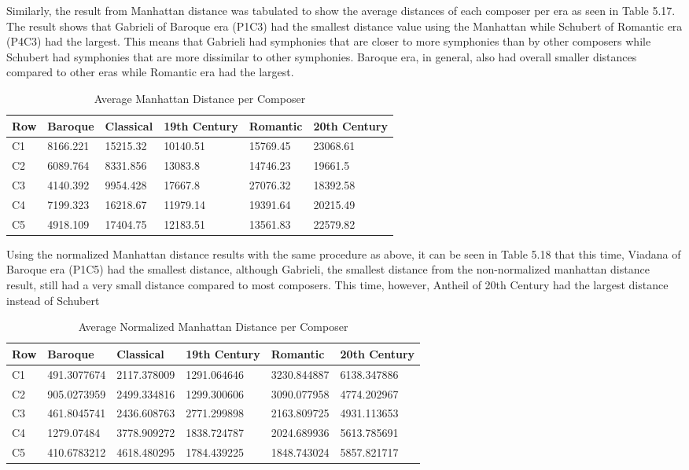 Similarly, the result from Manhattan distance was tabulated to show the average distances of each composer per era as seen in Table 5.17. The result shows that Gabrieli of Baroque era (P1C3) had the smallest distance value using the Manhattan while Schubert of Romantic era (P4C3) had the largest. This means that Gabrieli had symphonies that are closer to more symphonies than by other composers while Schubert had symphonies that are more dissimilar to other symphonies. Baroque era, in general, also had overall smaller distances compared to other eras while Romantic era had the largest.

\begin{longtable}{|l|l|l|l|l|l|}
\caption{Average Manhattan Distance per Composer}
\label{my-label}\\
\hline
Row & Baroque & Classical & 19th Century & Romantic & 20th Century \\ \hline
\endfirsthead
%
\endhead
%
C1 & 8166.221 & 15215.32 & 10140.51 & 15769.45 & 23068.61 \\ \hline
C2 & 6089.764 & 8331.856 & 13083.8 & 14746.23 & 19661.5 \\ \hline
C3 & 4140.392 & 9954.428 & 17667.8 & 27076.32 & 18392.58 \\ \hline
C4 & 7199.323 & 16218.67 & 11979.14 & 19391.64 & 20215.49 \\ \hline
C5 & 4918.109 & 17404.75 & 12183.51 & 13561.83 & 22579.82 \\ \hline
\end{longtable}

Using the normalized Manhattan distance results with the same procedure as above, it can be seen in Table 5.18 that this time, Viadana of Baroque era (P1C5) had the smallest distance, although Gabrieli, the smallest distance from the non-normalized manhattan distance result, still had a very small distance compared to most composers. This time, however, Antheil of 20th Century had the largest distance instead of Schubert

\begin{longtable}{|l|l|l|l|l|l|}
\caption{Average Normalized Manhattan Distance per Composer}
\label{my-label}\\
\hline
Row & Baroque & Classical & 19th Century & Romantic & 20th Century \\ \hline
\endfirsthead
%
\endhead
%
C1 & 491.3077674 & 2117.378009 & 1291.064646 & 3230.844887 & 6138.347886 \\ \hline
C2 & 905.0273959 & 2499.334816 & 1299.300606 & 3090.077958 & 4774.202967 \\ \hline
C3 & 461.8045741 & 2436.608763 & 2771.299898 & 2163.809725 & 4931.113653 \\ \hline
C4 & 1279.07484 & 3778.909272 & 1838.724787 & 2024.689936 & 5613.785691 \\ \hline
C5 & 410.6783212 & 4618.480295 & 1784.439225 & 1848.743024 & 5857.821717 \\ \hline
\end{longtable}